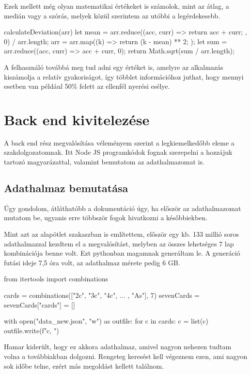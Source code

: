 Ezek mellett még olyan matematikai értékeket is számolok, mint az átlag, a medián vagy a szórás, melyek közül szerintem az utóbbi a legérdekesebb.

\begin{python}
        calculateDeviation(arr) {
      let mean =
        arr.reduce((acc, curr) => {
          return acc + curr;
        }, 0) / arr.length;
      arr = arr.map((k) => {
        return (k - mean) ** 2;
      });
      let sum = arr.reduce((acc, curr) => acc + curr, 0);
      return Math.sqrt(sum / arr.length);
    }
\end{python}

A felhasználó továbbá meg tud adni egy értéket is, amelyre az alkalmazás kiszámolja a relatív gyakoriságot, így többlet információhoz juthat, hogy mennyi esetben van például 50\% felett az ellenfél nyerési esélye.

\section{Back end kivitelezése}
A back end rész megvalósítása véleményem szerint a legkiemelkedőbb eleme a szakdolgozatomnak. Itt Node JS programkódok fognak szerepelni a hozzájuk tartozó magyarázattal, valamint bemutatom az adathalmazomat is.

\subsection{Adathalmaz bemutatása}
Úgy gondolom, átláthatóbb a dokumentáció úgy, ha először az adathalmazomat mutatom be, ugyanis erre többször fogok hivatkozni a későbbiekben. 

Mint azt az alapötlet szakaszban is említettem, először egy kb. 133 millió soros adathalmazzal kezdtem el a megvalósítást, melyben az összes lehetséges 7 lap kombinációja benne volt. Ezt pythonban magamnak generáltam le. A generáció futási ideje 7,5 óra volt, az adathalmaz mérete pedig 6 GB.

\begin{python}
from itertools import combinations

cards = combinations(["2c", "3c", "4c", ... , "As"], 7)
sevenCards = {}
sevenCards["cards"] = []

with open("data_new.json", "w") as outfile:
    for c in cards:
        c = list(c)
        outfile.write(f"{c}, \n")
\end{python}

Hamar kiderült, hogy ez akkora adathalmaz, amivel nagyon nehezen tudtam volna a továbbiakban dolgozni. Rengeteg keresést kell végeznem ezen, ami nagyon sok időbe telne, ezért más megoldást kellett találnom.


